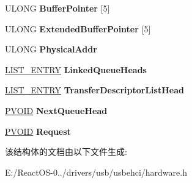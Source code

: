 \begin{DoxyCompactItemize}
\begin{tabbing}
\end{tabbing}\item 
\mbox{\label{struct___q_u_e_u_e___h_e_a_d_ac199027ac263a47ce29ef9d41c8ef1af}} 
U\+L\+O\+NG {\bfseries Buffer\+Pointer} \mbox{[}5\mbox{]}
\item 
\mbox{\label{struct___q_u_e_u_e___h_e_a_d_a09fcddb10a4276c0a630fa2dcb319c35}} 
U\+L\+O\+NG {\bfseries Extended\+Buffer\+Pointer} \mbox{[}5\mbox{]}
\item 
\mbox{\label{struct___q_u_e_u_e___h_e_a_d_a336e919c032d80a27f168ded22a665bd}} 
U\+L\+O\+NG {\bfseries Physical\+Addr}
\item 
\mbox{\label{struct___q_u_e_u_e___h_e_a_d_a4804595c83f80088cba912a3b5665dab}} 
\hyperlink{struct___l_i_s_t___e_n_t_r_y}{L\+I\+S\+T\+\_\+\+E\+N\+T\+RY} {\bfseries Linked\+Queue\+Heads}
\item 
\mbox{\label{struct___q_u_e_u_e___h_e_a_d_ac0d0fc41f9084933ed7c2e839731fd03}} 
\hyperlink{struct___l_i_s_t___e_n_t_r_y}{L\+I\+S\+T\+\_\+\+E\+N\+T\+RY} {\bfseries Transfer\+Descriptor\+List\+Head}
\item 
\mbox{\label{struct___q_u_e_u_e___h_e_a_d_a27e0ca533df8ecda30bc727262402d60}} 
\hyperlink{interfacevoid}{P\+V\+O\+ID} {\bfseries Next\+Queue\+Head}
\item 
\mbox{\label{struct___q_u_e_u_e___h_e_a_d_a76c87c5cac4f056d6191b7100d58c434}} 
\hyperlink{interfacevoid}{P\+V\+O\+ID} {\bfseries Request}
\end{DoxyCompactItemize}


该结构体的文档由以下文件生成\+:\begin{DoxyCompactItemize}
\item 
E\+:/\+React\+O\+S-\/0../drivers/usb/usbehci/hardware.\+h\end{DoxyCompactItemize}

